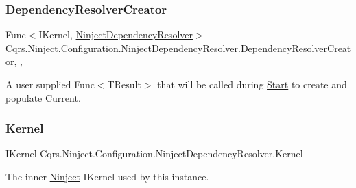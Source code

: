 \subsubsection{\texorpdfstring{Dependency\+Resolver\+Creator}{DependencyResolverCreator}}
{\footnotesize\ttfamily Func$<$I\+Kernel, \hyperlink{classCqrs_1_1Ninject_1_1Configuration_1_1NinjectDependencyResolver}{Ninject\+Dependency\+Resolver}$>$ Cqrs.\+Ninject.\+Configuration.\+Ninject\+Dependency\+Resolver.\+Dependency\+Resolver\+Creator\hspace{0.3cm}{\ttfamily [static]}, {\ttfamily [get]}, {\ttfamily [set]}}



A user supplied Func$<$\+T\+Result$>$ that will be called during \hyperlink{classCqrs_1_1Ninject_1_1Configuration_1_1NinjectDependencyResolver_adc6171ed45679dcbaa67782770ba5083_adc6171ed45679dcbaa67782770ba5083}{Start} to create and populate \hyperlink{classCqrs_1_1Configuration_1_1DependencyResolver_aaede4bbd564000f2becf65e8be863fff_aaede4bbd564000f2becf65e8be863fff}{Current}. 

\mbox{\label{classCqrs_1_1Ninject_1_1Configuration_1_1NinjectDependencyResolver_a507ba37916f7e77cd5bbcc14543c03b5_a507ba37916f7e77cd5bbcc14543c03b5}} 
\subsubsection{\texorpdfstring{Kernel}{Kernel}}
{\footnotesize\ttfamily I\+Kernel Cqrs.\+Ninject.\+Configuration.\+Ninject\+Dependency\+Resolver.\+Kernel\hspace{0.3cm}{\ttfamily [get]}}



The inner \hyperlink{namespaceCqrs_1_1Ninject}{Ninject} I\+Kernel used by this instance. 

